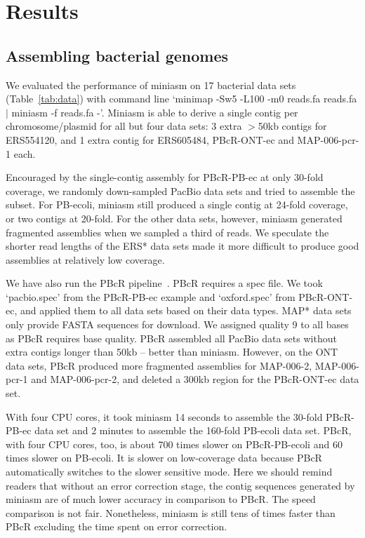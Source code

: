 \documentclass{bioinfo}
\begin{document}
\section{Results}

\subsection{Assembling bacterial genomes}

We evaluated the performance of miniasm on 17 bacterial data sets
(Table~\ref{tab:data}) with command line `minimap -Sw5 -L100 -m0 reads.fa reads.fa $|$
miniasm -f reads.fa -'. Miniasm is able to derive a single contig per
chromosome/plasmid for all but four data sets: 3 extra $>$50kb contigs for
ERS554120, and 1 extra contig for ERS605484, PBcR-ONT-ec and MAP-006-pcr-1
each. 

Encouraged by the single-contig assembly for PBcR-PB-ec at only 30-fold
coverage, we randomly down-sampled PacBio data sets and tried to assemble the
subset. For PB-ecoli, miniasm still produced a single contig at 24-fold
coverage, or two contigs at 20-fold. For the other data sets, however, miniasm
generated fragmented assemblies when we sampled a third of reads. We speculate
the shorter read lengths of the ERS* data sets made it more difficult to
produce good assemblies at relatively low coverage.

We have also run the PBcR pipeline~\citep{Berlin:2015xy}. PBcR requires a spec
file. We took `pacbio.spec' from the PBcR-PB-ec example and `oxford.spec' from
PBcR-ONT-ec, and applied them to all data sets based on their data types. MAP*
data sets only provide FASTA sequences for download. We assigned quality 9 to
all bases as PBcR requires base quality. PBcR assembled all PacBio data sets
without extra contigs longer than 50kb -- better than miniasm. However, on the
ONT data sets, PBcR produced more fragmented assemblies for MAP-006-2,
MAP-006-pcr-1 and MAP-006-pcr-2, and deleted a 300kb region for the PBcR-ONT-ec
data set. 

With four CPU cores, it took miniasm 14 seconds to assemble the 30-fold
PBcR-PB-ec data set and 2 minutes to assemble the 160-fold PB-ecoli data set.
PBcR, with four CPU cores, too, is about 700 times slower on PBcR-PB-ecoli and
60 times slower on PB-ecoli.  It is slower on low-coverage data
because PBcR automatically switches to the slower sensitive mode. Here we
should remind readers that without an error correction stage, the contig
sequences generated by miniasm are of much lower accuracy in comparison to
PBcR. The speed comparison is not fair. Nonetheless, miniasm is still tens of
times faster than PBcR excluding the time spent on error correction.
\end{document}
